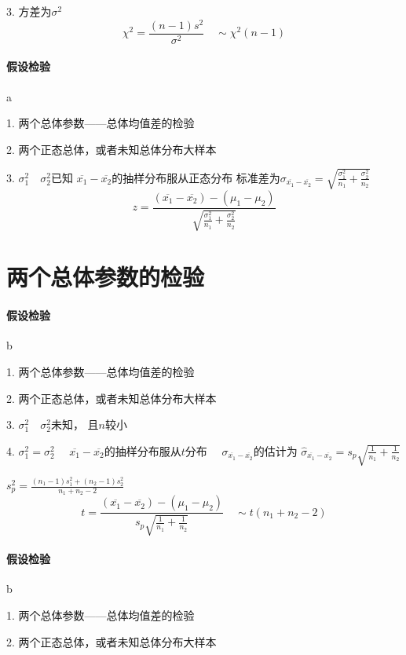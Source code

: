\documentclass[UTF8,10pt]{book}
\begin{document}
        3. 方差为$\sigma^2$	
        $$ \chi^2 = \frac{(n-1)s^2}{\sigma^2} \quad \sim \chi^2(n-1) $$
        
        \paragraph{假设检验}   a
        
        1. 两个总体参数——总体均值差的检验 
        
        2. 两个正态总体，或者未知总体分布大样本 
        
        3. $\sigma_1^2 \quad \sigma_2^2$已知	
        $\overline{x_1} - \overline{x_2}$的抽样分布服从正态分布 
        标准差为$ \sigma_{\overline{x_1} - \overline{x_2}} =\sqrt{\frac{\sigma_1^2}{n_1}+\frac{\sigma_2^2}{n_2}} $ 
        $$ z = \frac{(\overline{x_1} - \overline{x_2} )- (\mu_1-\mu_2)}{\sqrt{\frac{\sigma_1^2}{n_1}+\frac{\sigma_2^2}{n_2}} } $$
        
    \section{两个总体参数的检验}

    
    \paragraph{假设检验} b
   
    1. 两个总体参数——总体均值差的检验 
    
    2. 两个正态总体，或者未知总体分布大样本 
    
    3. $\sigma_1^2 \quad \sigma_2^2$未知，
    且$n$较小 
    
    4. $\sigma_1^2 = \sigma_2^2 \quad$	
    $\overline{x_1} - \overline{x_2}$的抽样分布服从$t$分布 
    $\quad \sigma_{\overline{x_1} - \overline{x_2}} $的估计为 
    $ \hat{\sigma}_{\overline{x_1} - \overline{x_2}} =s_p \sqrt{\frac{1}{n_1}+\frac{1}{n_2}} $ 
    
    $s_p^2 = \frac{(n_1-1)s_1^2 + (n_2-1)s_2^2}{n_1+n_2-2}$ $$ t = \frac{(\overline{x_1} - \overline{x_2} )- (\mu_1-\mu_2)}{s_p \sqrt{\frac{1}{n_1}+\frac{1}{n_2}}} \quad \sim t(n_1+n_2-2)$$
    
    \paragraph{假设检验} b
    
    1. 两个总体参数——总体均值差的检验 
    
    2. 两个正态总体，或者未知总体分布大样本 
    
\end{document}
